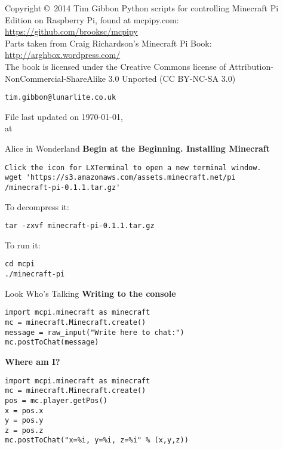 \documentclass[avery5388,grid]{flashcards}
\begin{document}
\begin{flashcard}{Copyright \copyright \, 2014 Tim Gibbon }
Python scripts for controlling Minecraft Pi Edition on Raspberry Pi, found at mcpipy.com: \url{https://github.com/brooksc/mcpipy}\\
Parts taken from Craig Richardson's Minecraft Pi Book: \url{http://arghbox.wordpress.com/}\\
The book is licensed under the Creative Commons license of Attribution-NonCommercial-ShareAlike 3.0 Unported (CC BY-NC-SA 3.0)
\begin{center}
\begin{small}\tt tim.gibbon@lunarlite.co.uk\end{small}

\medskip
File last updated on \today, \\
at \currenttime
\end{center}
\end{flashcard}



\lstset{language=Python}
\begin{flashcard}[API]{Alice in Wonderland}
{\bf Begin at the Beginning. Installing Minecraft }
\begin{lstlisting}
Click the icon for LXTerminal to open a new terminal window.
wget 'https://s3.amazonaws.com/assets.minecraft.net/pi
/minecraft-pi-0.1.1.tar.gz'
\end{lstlisting}
To decompress it:
 \begin{lstlisting}
tar -zxvf minecraft-pi-0.1.1.tar.gz
\end{lstlisting}
To run it: 
 \begin{lstlisting}
cd mcpi
./minecraft-pi
\end{lstlisting}
\end{flashcard}

\begin{flashcard}[API]{Look Who's Talking}
{\bf Writing to the console}
\begin{lstlisting}
import mcpi.minecraft as minecraft
mc = minecraft.Minecraft.create()
message = raw_input("Write here to chat:")
mc.postToChat(message)
\end{lstlisting}
{\bf Where am I?}
\begin{lstlisting}
import mcpi.minecraft as minecraft
mc = minecraft.Minecraft.create()
pos = mc.player.getPos()
x = pos.x
y = pos.y
z = pos.z
mc.postToChat("x=%i, y=%i, z=%i" % (x,y,z))
\end{lstlisting}
\end{flashcard}
\end{document}
